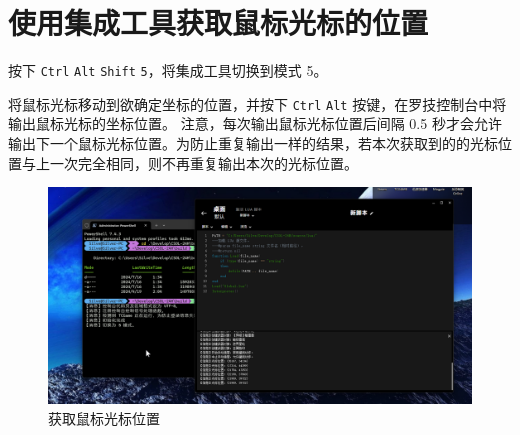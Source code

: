\section{使用集成工具获取鼠标光标的位置}

按下 \lstinline{Ctrl} \lstinline{Alt} \lstinline{Shift} \lstinline{5}，将集成工具切换到模式 5。

将鼠标光标移动到欲确定坐标的位置，并按下 \lstinline{Ctrl} \lstinline{Alt} 按键，在罗技控制台中将输出鼠标光标的坐标位置。
注意，每次输出鼠标光标位置后间隔 0.5 秒才会允许输出下一个鼠标光标位置。为防止重复输出一样的结果，若本次获取到的的光标位置与上一次完全相同，则不再重复输出本次的光标位置。

\begin{figure}[H]
    \Centering
    \includegraphics[width=\textwidth]{docs/assets/position.png}
    \caption{获取鼠标光标位置}
\end{figure}